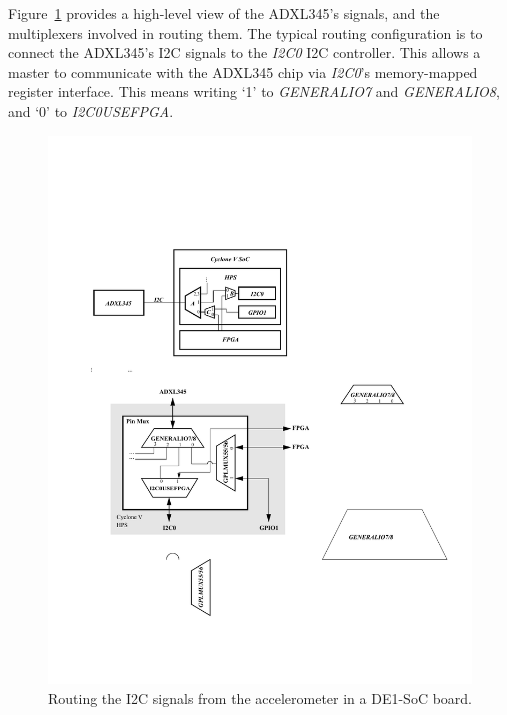 \documentclass[11pt, twoside, pdftex]{article}
\begin{document}
Figure~\ref{fig:pinmux} provides a high-level view of the ADXL345's signals, and the multiplexers involved in routing them. The typical routing configuration is to connect the ADXL345's I2C signals to the \textit{I2C0} I2C controller. This allows a master to communicate with the ADXL345 chip via \textit{I2C0}'s memory-mapped register interface. This means writing `1' to \textit{GENERALIO7} and \textit{GENERALIO8}, and `0' to \textit{I2C0USEFPGA}. %

\begin{figure} [H]
\begin{center}
\includegraphics[scale = 0.8]{figures/fig_pinmux.pdf}
\end{center}
\caption{Routing the I2C signals from the accelerometer in a DE1-SoC board.}
\label{fig:pinmux}
\end{figure}
\end{document}
